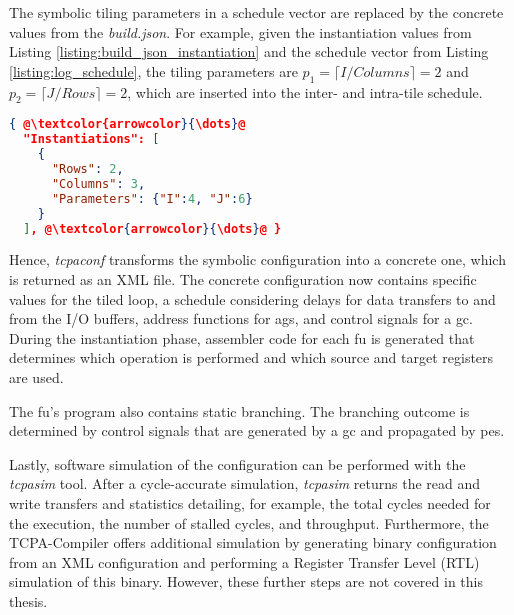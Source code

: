 The symbolic tiling parameters in a schedule vector are replaced by the concrete values from the \textit{build.json}.
For example, given the instantiation values from Listing \ref{listing:build_json_instantiation} and the schedule vector from Listing \ref{listing:log_schedule}, the tiling parameters are $p_1 = \lceil I/{Columns} \rceil = 2$ and $p_2=\lceil J/{Rows} \rceil = 2$, which are inserted into the inter- and intra-tile schedule.

\begin{lstlisting}[language=JSON, float, escapechar=@, caption={Excerpt of a build.json specifying one instantiation for loop bounds $I = 4$ and $J = 6$, and $2 \times 2$ allocated \acp{pe}.}, captionpos=b,label=listing:build_json_instantiation]
{ @\textcolor{arrowcolor}{\dots}@ 
  "Instantiations": [
    { 
      "Rows": 2,
      "Columns": 3,
      "Parameters": {"I":4, "J":6}
    } 
  ], @\textcolor{arrowcolor}{\dots}@ }
\end{lstlisting}

Hence, \textit{tcpaconf} transforms the symbolic configuration into a concrete one, which is returned as an XML file.
The concrete configuration now contains specific values for the tiled loop, a schedule considering delays for data transfers to and from the I/O buffers, address functions for \acfp{ag}, and control signals for a \acf{gc}.
During the instantiation phase, assembler code for each \ac{fu} is generated that determines which operation is performed and which source and target registers are used.

The \ac{fu}'s program also contains static branching.
The branching outcome is determined by control signals that are generated by a \ac{gc} and propagated by \acp{pe}.

Lastly, software simulation of the configuration can be performed with the \textit{tcpasim} tool.
After a cycle-accurate simulation, \textit{tcpasim} returns the read and write transfers and statistics detailing, for example, the total cycles needed for the execution, the number of stalled cycles, and throughput.
Furthermore, the TCPA-Compiler offers additional simulation by generating binary configuration from an XML configuration and performing a Register Transfer Level (RTL) simulation of this binary.
However, these further steps are not covered in this thesis.





















